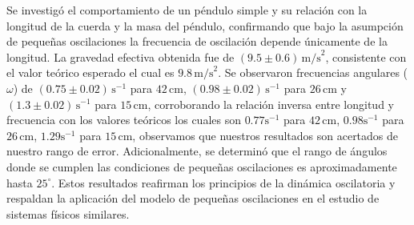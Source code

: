 \documentclass[12pt,a4]{article}
\begin{document}
Se investigó el comportamiento de un péndulo simple y su relación con la longitud de la cuerda y la masa del péndulo, confirmando que bajo la asumpción de pequeñas oscilaciones la frecuencia de oscilación depende únicamente de la longitud. La gravedad efectiva obtenida fue de \((9.5 \pm 0.6) \, \text{m/s}^2\), consistente con el valor teórico esperado el cual es \(9.8 \, \text{m/s}^2\). Se observaron frecuencias angulares (\(\omega\)) de \((0.75 \pm 0.02)\, \text{s}^{-1}\) para \(42 \, \text{cm}\), \((0.98 \pm 0.02) \, \text{s}^{-1}\) para \(26 \, \text{cm}\) y \((1.3 \pm 0.02) \, \text{s}^{-1}\) para \(15 \, \text{cm}\), corroborando la relación inversa entre longitud y frecuencia con los valores teóricos los cuales son \(0.77 \text{s}^{-1}\) para \(42 \, \text{cm}\), \(0.98 \text{s}^{-1}\) para \(26 \, \text{cm}\), \(1.29 \text{s}^{-1}\) para \(15 \, \text{cm}\), observamos que nuestros resultados son acertados de nuestro rango de error. Adicionalmente, se determinó que el rango de ángulos donde se cumplen las condiciones de pequeñas oscilaciones es aproximadamente hasta $25^\circ$. Estos resultados reafirman los principios de la dinámica oscilatoria y respaldan la aplicación del modelo de pequeñas oscilaciones en el estudio de sistemas físicos similares.
\end{document}
